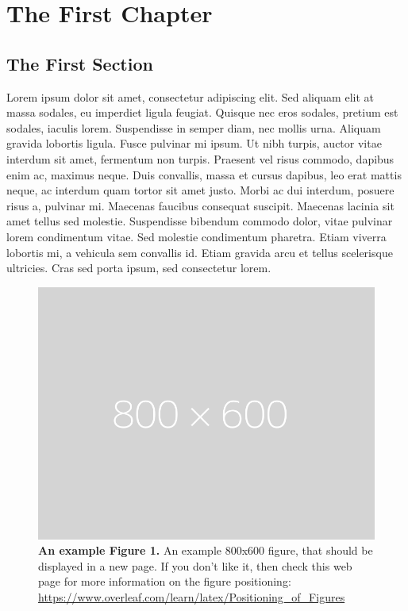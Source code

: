 \chapter{The First Chapter}
\section{The First Section}
Lorem ipsum dolor sit amet\cite{einstein,latexcompanion,knuthwebsite}, consectetur adipiscing elit. Sed aliquam elit at massa sodales, eu imperdiet ligula feugiat. Quisque nec eros sodales, pretium est sodales, iaculis lorem. Suspendisse in semper diam, nec mollis urna. Aliquam gravida lobortis ligula. Fusce pulvinar mi ipsum. Ut nibh turpis, auctor vitae interdum sit amet, fermentum non turpis. Praesent vel risus commodo, dapibus enim ac, maximus neque. Duis convallis, massa et cursus dapibus, leo erat mattis neque, ac interdum quam tortor sit amet justo. Morbi ac dui interdum, posuere risus a, pulvinar mi. Maecenas faucibus consequat suscipit. Maecenas lacinia sit amet tellus sed molestie. Suspendisse bibendum commodo dolor, vitae pulvinar lorem condimentum vitae. Sed molestie condimentum pharetra. Etiam viverra lobortis mi, a vehicula sem convallis id. Etiam gravida arcu et tellus scelerisque ultricies. Cras sed porta ipsum, sed consectetur lorem.

\begin{figure}[p]
    \centering
    \includegraphics[width=\textwidth]{figures/placeholder.png}
    \caption[An example Figure 1.]{\textbf{An example Figure 1.} An example 800x600 figure, that should be displayed in a new page. If you don't like it, then check this web page for more information on the figure positioning: \href{https://www.overleaf.com/learn/latex/Positioning_of_Figures}{https://www.overleaf.com/learn/latex/Positioning\_of\_Figures}}
    \label{figlabel1}
\end{figure}

